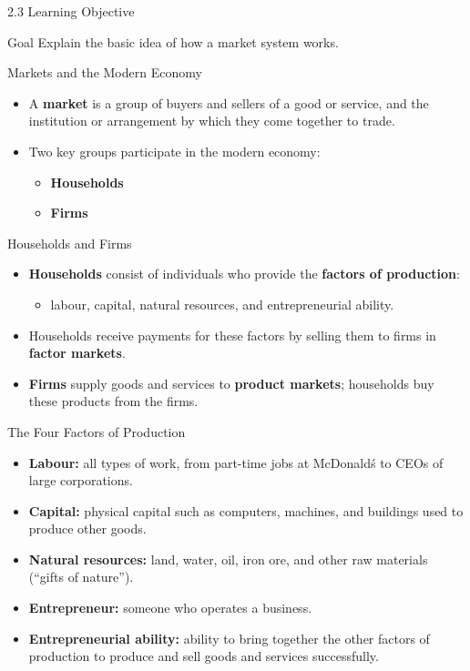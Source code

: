 \documentclass[aspectratio=169]{beamer}
\begin{document}
\begin{frame}{2.3 Learning Objective}
\transfade
\begin{block}{Goal}
Explain the basic idea of how a market system works.
\end{block}
\end{frame}

\begin{frame}{Markets and the Modern Economy}
\transfade
\begin{itemize}
  \item A \textbf{market} is a group of buyers and sellers of a good or service, and the institution or arrangement by which they come together to trade.
  \item Two key groups participate in the modern economy:
  \begin{itemize}
    \item \textbf{Households}
    \item \textbf{Firms}
  \end{itemize}
\end{itemize}
\end{frame}

\begin{frame}{Households and Firms}
\transfade
\begin{itemize}
  \item \textbf{Households} consist of individuals who provide the \textbf{factors of production}:
  \begin{itemize}
    \item labour, capital, natural resources, and entrepreneurial ability.
  \end{itemize}
  \item Households receive payments for these factors by selling them to firms in \textbf{factor markets}.
  \item \textbf{Firms} supply goods and services to \textbf{product markets}; households buy these products from the firms.
\end{itemize}
\end{frame}

\begin{frame}{The Four Factors of Production}
\transfade
\begin{itemize}
  \item \textbf{Labour:} all types of work, from part-time jobs at McDonald\'s to CEOs of large corporations.
  \item \textbf{Capital:} physical capital such as computers, machines, and buildings used to produce other goods.
  \item \textbf{Natural resources:} land, water, oil, iron ore, and other raw materials (``gifts of nature'').
  \item \textbf{Entrepreneur:} someone who operates a business.
  \item \textbf{Entrepreneurial ability:} ability to bring together the other factors of production to produce and sell goods and services successfully.
\end{itemize}
\end{frame}
\end{document}

